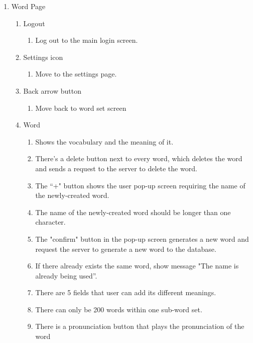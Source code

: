 \documentclass[conference]{IEEEtran}
\begin{document}
\begin{enumerate}
\begin{enumerate}
            \end{enumerate}
        \item Word Page
            \begin{enumerate}
                \item Logout
                \begin{enumerate}
                    \item Log out to the main login screen.
                \end{enumerate}
                \item Settings icon
                \begin{enumerate}
                    \item Move to the settings page.
                \end{enumerate}
                \item Back arrow button
                \begin{enumerate}
                    \item Move back to word set screen
                \end{enumerate}
                \item Word
                \begin{enumerate}
                    \item Shows the vocabulary and the meaning of it.
                    \item There’s a delete button next to every word, which deletes the word and sends a request to the server to delete the word.
                    \item The “+" button shows the user pop-up screen requiring the name of the newly-created word.
                    \item The name of the newly-created word should be longer than one character.
                    \item The "confirm" button in the pop-up screen generates a new word and request the server to generate a new word to the database.
                    \item If there already exists the same word, show message "The name is already being used”.
                    \item There are 5 fields that user can add its different meanings.
                    \item There can only be 200 words within one sub-word set.
                    \item There is a pronunciation button that plays the pronunciation of the word

\end{enumerate}
\end{enumerate}
\end{enumerate}
\end{document}
